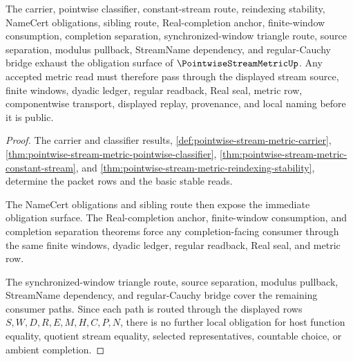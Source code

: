 \begin{theorem}\label{thm:pointwise-stream-metric-obligation-scope}
The carrier, pointwise classifier, constant-stream route, reindexing stability, NameCert obligations, sibling route, Real-completion anchor, finite-window consumption, completion separation, synchronized-window triangle route, source separation, modulus pullback, StreamName dependency, and regular-Cauchy bridge exhaust the obligation surface of $\PointwiseStreamMetricUp$. Any accepted metric read must therefore pass through the displayed stream source, finite windows, dyadic ledger, regular readback, Real seal, metric row, componentwise transport, displayed replay, provenance, and local naming before it is public.
\end{theorem}
\begin{proof}
The carrier and classifier results, \autoref{def:pointwise-stream-metric-carrier}, \autoref{thm:pointwise-stream-metric-pointwise-classifier}, \autoref{thm:pointwise-stream-metric-constant-stream}, and \autoref{thm:pointwise-stream-metric-reindexing-stability}, determine the packet rows and the basic stable reads.

The NameCert obligations and sibling route then expose the immediate obligation surface. The Real-completion anchor, finite-window consumption, and completion separation theorems force any completion-facing consumer through the same finite windows, dyadic ledger, regular readback, Real seal, and metric row.

The synchronized-window triangle route, source separation, modulus pullback, StreamName dependency, and regular-Cauchy bridge cover the remaining consumer paths. Since each path is routed through the displayed rows $S,W,D,R,E,M,H,C,P,N$, there is no further local obligation for host function equality, quotient stream equality, selected representatives, countable choice, or ambient completion.
\end{proof}



